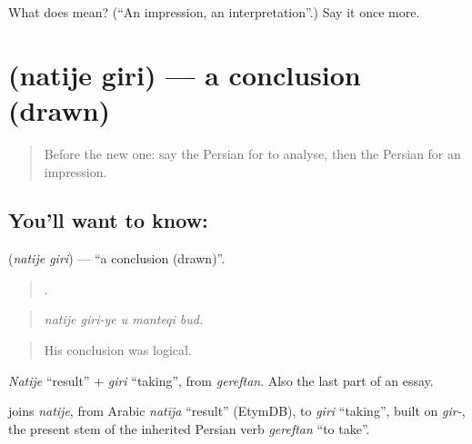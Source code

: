 \begin{tcolorbox}[breakable,colback=teal!4,colframe=teal!35!black,title={Before you move on}]
What does  mean? (\textquotedblleft{}An impression, an interpretation\textquotedblright{}.) Say it once more.
\end{tcolorbox}
\section[\texorpdfstring{\fa{نتیجه} \fa{گیری} (natije giri)}{نتیجه گیری (natije giri)}]{  (natije giri) — a conclusion (drawn)}

\label{lesson:FA-C368-natije-giri}



\begin{quote}
Before the new one: say the Persian for to analyse, then the Persian for an impression.
\end{quote}

\subsection*{You'll want to know:  }
\textbf{ } (\emph{natije giri}) — \textquotedblleft{}a conclusion (drawn)\textquotedblright{}.

\begin{quote}
    .
\end{quote}

\begin{quote}
\emph{natije giri-ye u manteqi bud.}
\end{quote}

\begin{quote}
His conclusion was logical.
\end{quote}

\emph{Natije} \textquotedblleft{}result\textquotedblright{} + \emph{giri} \textquotedblleft{}taking\textquotedblright{}, from \emph{gereftan}. Also the last part of an essay.

\begin{cousinweb}
\textbf{ } joins \emph{natije}, from Arabic \emph{natīja} \textquotedblleft{}result\textquotedblright{} (EtymDB), to \emph{giri} \textquotedblleft{}taking\textquotedblright{}, built on \emph{gir-}, the present stem of the inherited Persian verb \emph{gereftan} \textquotedblleft{}to take\textquotedblright{}.
\end{cousinweb}

